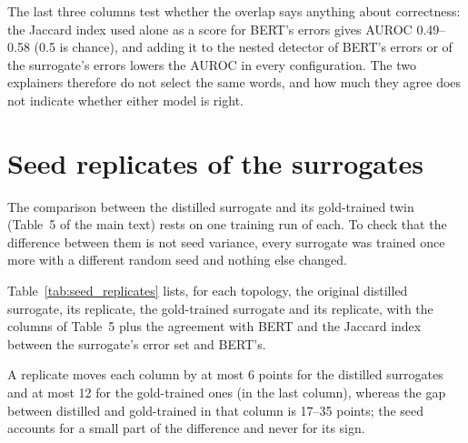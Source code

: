 \documentclass[review,12pt]{elsarticle}
\begin{document}
The last three columns test whether the overlap says anything about correctness: the Jaccard index used alone as a score for BERT's errors gives AUROC 0.49--0.58 (0.5 is chance), and adding it to the nested detector of BERT's errors or of the surrogate's errors lowers the AUROC in every configuration. The two explainers therefore do not select the same words, and how much they agree does not indicate whether either model is right.


\begin{table}[H]
\centering
\scriptsize
\setlength{\tabcolsep}{4pt}
\caption{Overlap between the words highlighted by the graph explainer and by TokenSHAP at the 20\% budget, per instance: mean Jaccard index, mean Spearman correlation of the shared words, and share of instances with the same top-1 word. AUROC: the Jaccard index used alone as a score for BERT's gold-label errors. \(\Delta\)AUROC: paired-bootstrap gain of adding the overlap to the nested detector of BERT's errors and of the surrogate's errors, with 95\% intervals.}
\label{tab:overlap}
\end{table}

\section{Seed replicates of the surrogates}

The comparison between the distilled surrogate and its gold-trained twin (Table~5 of the main text) rests on one training run of each. To check that the difference between them is not seed variance, every surrogate was trained once more with a different random seed and nothing else changed.

Table~\ref{tab:seed_replicates} lists, for each topology, the original distilled surrogate, its replicate, the gold-trained surrogate and its replicate, with the columns of Table~5 plus the agreement with BERT and the Jaccard index between the surrogate's error set and BERT's.

A replicate moves each column by at most 6 points for the distilled surrogates and at most 12 for the gold-trained ones (in the last column), whereas the gap between distilled and gold-trained in that column is 17--35 points; the seed accounts for a small part of the difference and never for its sign.
\end{document}
